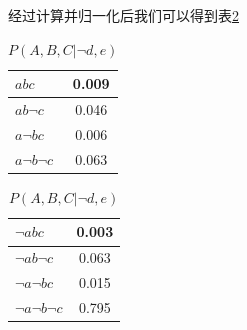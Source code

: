 \documentclass[a4paper, 11pt]{article}
\begin{document}
\begin{enumerate}
\begin{enumerate}[(a)]
    经过计算并归一化后我们可以得到表\ref{Q3T2}
    \begin{table}
      \centering
      \begin{tabular}{|l|c|}
        \hline
        $abc$&0.009\\
        \hline
        $ab\lnot c$&0.046\\
        \hline
        $a\lnot bc$&0.006\\
        \hline
        $a\lnot b\lnot c$&0.063\\
        \hline
      \end{tabular}
      \begin{tabular}{|l|c|}
        \hline
        $\lnot abc$&0.003\\
        \hline
        $\lnot ab\lnot c$&0.063\\
        \hline
        $\lnot a\lnot bc$&0.015\\
        \hline
        $\lnot a\lnot b\lnot c$&0.795\\
        \hline
      \end{tabular}
      \caption{$P(A,B,C|\lnot d,e)$}
      \label{Q3T2}
    \end{table}



\end{enumerate}
\end{enumerate}
\end{document}
